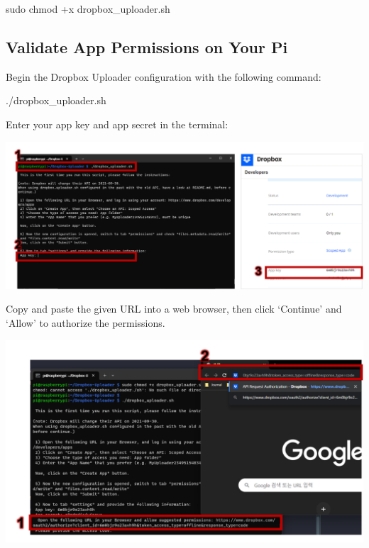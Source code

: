 \documentclass[
  letterpaper,
]{scrbook}
\newenvironment{Shaded}{\begin{snugshade}}{\end{snugshade}}
\newcommand{\ExtensionTok}[1]{\textcolor[rgb]{0.00,0.23,0.31}{#1}}
\newcommand{\FunctionTok}[1]{\textcolor[rgb]{0.28,0.35,0.67}{#1}}
\newcommand{\NormalTok}[1]{\textcolor[rgb]{0.00,0.23,0.31}{#1}}
\begin{document}
\begin{Shaded}
\begin{Highlighting}[]
\FunctionTok{sudo}\NormalTok{ chmod +x dropbox\_uploader.sh}
\end{Highlighting}
\end{Shaded}

\subsection{Validate App Permissions on Your
Pi}\label{validate-app-permissions-on-your-pi}

Begin the Dropbox Uploader configuration with the following command:

\begin{Shaded}
\begin{Highlighting}[]
\ExtensionTok{./dropbox\_uploader.sh}
\end{Highlighting}
\end{Shaded}

Enter your app key and app secret in the terminal:

\includegraphics{content/material/ch2/dropbox_register1.png}

Copy and paste the given URL into a web browser, then click `Continue'
and `Allow' to authorize the permissions.

\includegraphics{content/material/ch2/dropbox_register2.png}
\end{document}
